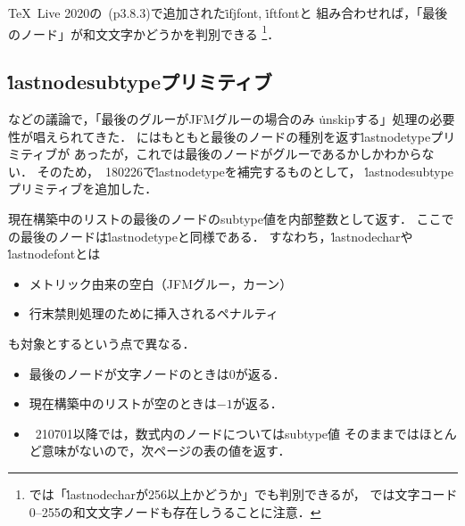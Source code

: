 \documentclass[a4paper,11pt,nomag,dvipdfmx]{jsarticle}
\begin{document}
\TeX~Live 2020の\pTeX~(p3.8.3)で追加された\.{ifjfont}, \.{iftfont}と
組み合わせれば，「最後のノード」が和文文字かどうかを判別できる
\footnote{\epTeX では「\.{lastnodechar}が256以上かどうか」でも判別できるが，
\eupTeX では文字コード0--255の和文文字ノードも存在しうることに注意．}．


\subsection{\.{lastnodesubtype}プリミティブ}
\cite{tjb28,plt63}などの議論で，「最後のグルーがJFMグルーの場合のみ
\.{unskip}する」処理の必要性が唱えられてきた．
\eTeX にはもともと最後のノードの種別を返す\.{lastnodetype}プリミティブが
あったが，これでは最後のノードがグルーであるかしかわからない．
そのため，\epTeX~180226で\.{lastnodetype}を補完するものとして，
\.{lastnodesubtype}プリミティブを追加した．

\begin{cslist}
  現在構築中のリストの最後のノードのsubtype値を内部整数として返す．
  ここでの最後のノードは\.{lastnodetype}と同様である．
  すなわち，\.{lastnodechar}や\.{lastnodefont}とは
  \begin{itemize}
    \item メトリック由来の空白（JFMグルー，カーン）
    \item 行末禁則処理のために挿入されるペナルティ
  \end{itemize}
  も対象とするという点で異なる．
  \begin{itemize}
    \item 最後のノードが文字ノードのときは0が返る．
    \item 現在構築中のリストが空のときは$-1$が返る．
    \item \epTeX~210701以降では，数式内のノードについてはsubtype値
      そのままではほとんど意味がないので，次ページの表の値を返す．
  \end{itemize}
\end{cslist}
\end{document}

